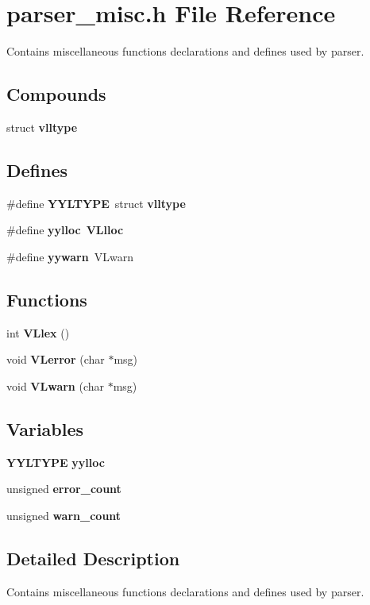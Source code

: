 \section{parser\_\-misc.h File Reference}
\label{parser__misc_8h}
Contains miscellaneous functions declarations and defines used by parser. 


\subsection*{Compounds}
\begin{CompactItemize}
\item 
struct {\bf vlltype}
\end{CompactItemize}
\subsection*{Defines}
\begin{CompactItemize}
\item 
\#define {\bf YYLTYPE}\ struct {\bf vlltype}
\item 
\#define {\bf yylloc}\ {\bf VLlloc}
\item 
\#define {\bf yywarn}\ VLwarn
\end{CompactItemize}
\subsection*{Functions}
\begin{CompactItemize}
\item 
int {\bf VLlex} ()
\item 
void {\bf VLerror} (char $\ast$msg)
\item 
void {\bf VLwarn} (char $\ast$msg)
\end{CompactItemize}
\subsection*{Variables}
\begin{CompactItemize}
\item 
{\bf YYLTYPE} {\bf yylloc}
\item 
unsigned {\bf error\_\-count}
\item 
unsigned {\bf warn\_\-count}
\end{CompactItemize}


\subsection{Detailed Description}
Contains miscellaneous functions declarations and defines used by parser.



